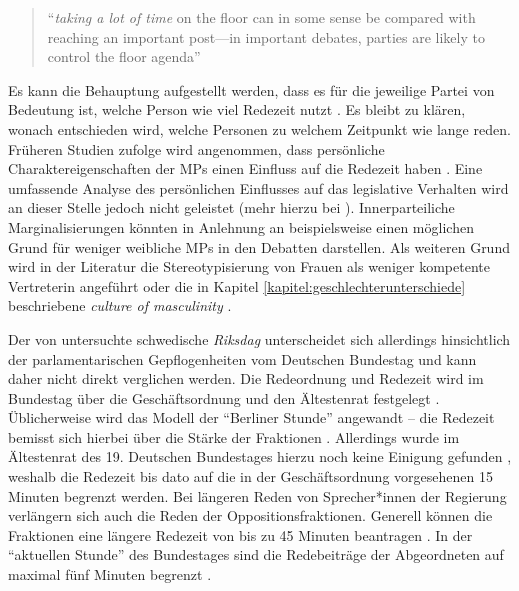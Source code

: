 \documentclass[12pt, 
    twoside=false, 
    bibliography=totoc, 
    numbers=endperiod, 
    headings=normal, 
    toc=chapterentrydotfill
    ]{scrbook}
\begin{document}
\citereset
\begin{quote}
     \enquote{\emph{taking a lot of time} on the floor can in some sense be compared with reaching an important post—in important debates, parties are likely to control the floor agenda} \parencites[507]{back_2014}
\end{quote}

Es kann die Behauptung aufgestellt werden, dass es für die jeweilige Partei von Bedeutung ist, welche Person wie viel Redezeit nutzt \parencite[vgl.][]{proksch_2012}. Es bleibt zu klären, wonach entschieden wird, welche Personen zu welchem Zeitpunkt wie lange reden.
%
Früheren Studien zufolge wird angenommen, dass persönliche Charaktereigenschaften der MPs einen Einfluss auf die Redezeit haben \parencite[505]{back_2014}. Eine umfassende Analyse des persönlichen Einflusses auf das legislative Verhalten wird an dieser Stelle jedoch nicht geleistet (mehr hierzu bei \textcite{saalfeld_2011}). Innerparteiliche Marginalisierungen könnten in Anlehnung an \textcite[507]{back_2014} beispielsweise einen möglichen Grund für weniger weibliche MPs in den Debatten darstellen. Als weiteren Grund wird in der Literatur die Stereotypisierung von Frauen als weniger kompetente Vertreterin angeführt oder die in Kapitel \ref{kapitel:geschlechterunterschiede} beschriebene \emph{culture of masculinity} \parencites[507]{back_2014}{lovenduski_2005}. 

Der von \textcite{back_2014} untersuchte schwedische \emph{Riksdag} unterscheidet sich allerdings hinsichtlich der parlamentarischen Gepflogenheiten vom Deutschen Bundestag und kann daher nicht direkt verglichen werden. Die Redeordnung und Redezeit wird im Bundestag über die Geschäftsordnung und den Ältestenrat festgelegt \parencite[64f.]{linn_2018}. Üblicherweise wird das Modell der \enquote{Berliner Stunde} angewandt -- die Redezeit bemisst sich hierbei über die Stärke der Fraktionen \parencite[vgl.][]{schreiner_2005}. Allerdings wurde im Ältestenrat des 19. Deutschen Bundestages hierzu noch keine Einigung gefunden \parencite[64]{linn_2018}, weshalb die Redezeit bis dato auf die in der Geschäftsordnung vorgesehenen 15 Minuten begrenzt werden. Bei längeren Reden von Sprecher*innen der Regierung verlängern sich auch die Reden der Oppositionsfraktionen. Generell können die Fraktionen eine längere Redezeit von bis zu 45 Minuten beantragen \parencite{bundestag_2019}. In der \enquote{aktuellen Stunde} des Bundestages sind die Redebeiträge der Abgeordneten auf maximal fünf Minuten begrenzt \parencites[68]{linn_2018}[]{bundestag_2019}.
\end{document}
